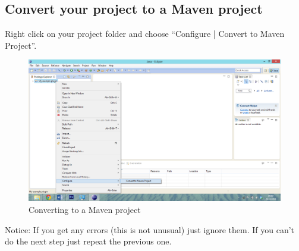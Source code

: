 \subsection{Convert your project to a Maven project}
Right click on your project folder and choose "`Configure | Convert to Maven Project"'.
 
\begin{figure}
	\centering
		\includegraphics[width=\textwidth]{converttomavenproject}
	\caption{Converting to a Maven project}
	\label{fig:converttomavenproject}
\end{figure}

Notice: If you get any errors (this is not unusual) just ignore them. If you can't do the next step just repeat the previous one.



